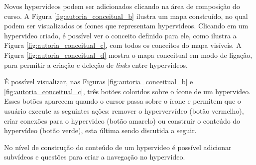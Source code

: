 Novos hypervideos podem ser adicionados clicando na área de composição do curso. A Figura \ref{fig:autoria_conceitual_b} ilustra um mapa construído, no qual podem ser visualizados os ícones que representam hypervideos. Clicando em um hypervideo criado, é possível ver o conceito definido para ele, como ilustra a Figura \ref{fig:autoria_conceitual_c}, com todos os conceitos do mapa visíveis. A Figura \ref{fig:autoria_conceitual_d}  mostra o mapa conceitual em modo de ligação, para permitir a criação e deleção de \textit{links} entre hypervideos.

É possível visualizar, nas Figuras \ref{fig:autoria_conceitual_b} e \ref{fig:autoria_conceitual_c}, três botões coloridos sobre o ícone de um hypervideo. Esses botões aparecem quando o cursor passa sobre o ícone e permitem que o usuário execute as seguintes ações: remover o hypervervídeo (botão vermelho), criar conexões para o hypervideo (botão amarelo) ou construir o conteúdo do hypervídeo (botão verde), esta última sendo discutida a seguir. 

No nível de construção do conteúdo de um hypervideo é possível adicionar subvídeos e questões para criar a navegação no hypervideo. 

